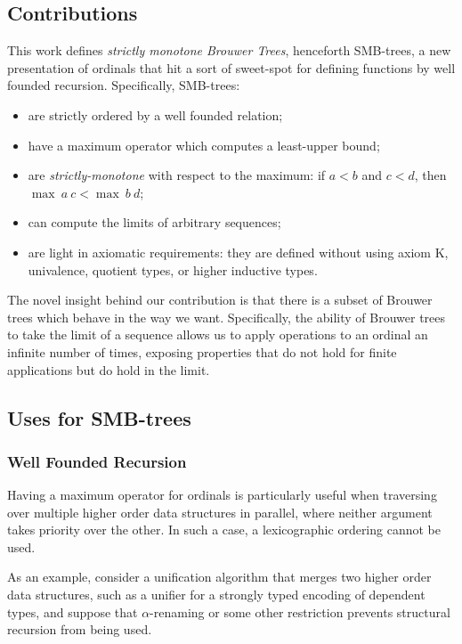 \subsection{Contributions}

This work defines \textit{strictly monotone Brouwer Trees}, henceforth SMB-trees,
a new presentation of ordinals that hit a sort of sweet-spot for defining functions by
well founded recursion. Specifically, SMB-trees:

\begin{itemize}
  \item are strictly ordered by a well founded relation;
  \item have a maximum operator which computes a least-upper bound;
  \item are \textit{strictly-monotone} with respect to the maximum: if $a < b$ and $c < d$, then $\max\ a\ c < \max\ b\ d$;
  \item can compute the limits of arbitrary sequences;
  \item are light in axiomatic requirements: they are defined without using axiom K,
        univalence, quotient types, or higher inductive types.
\end{itemize}

The novel insight behind our contribution is that there is a subset of
Brouwer trees which behave in the way we want. Specifically,
the ability of Brouwer trees to take the limit of a sequence allows
us to apply operations to an ordinal an infinite number of times,
exposing properties that do not hold for finite applications but do hold
in the limit.

\subsection{Uses for SMB-trees}

\subsubsection{Well Founded Recursion}

Having a maximum operator for ordinals is particularly useful when traversing over multiple higher order
data structures in parallel, where neither argument takes priority over the other.
In such a case, a lexicographic ordering cannot be used.

As an example, consider a unification algorithm that merges
two higher order data structures, such as a unifier for a strongly typed encoding of dependent types,
 and suppose that $\alpha$-renaming or some other restriction prevents
 structural recursion from being used.

